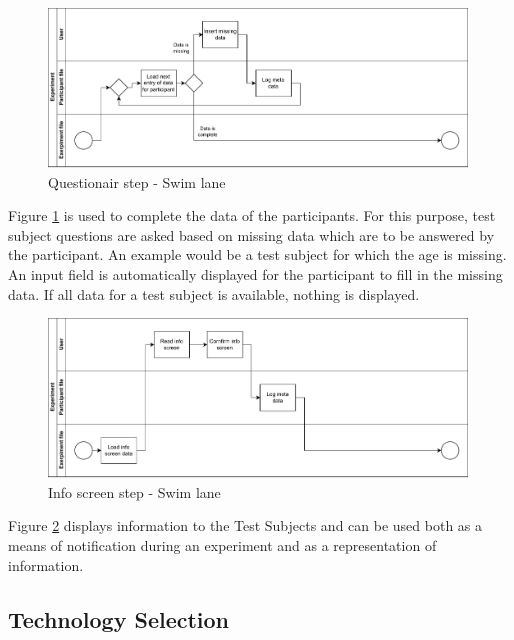 \begin{figure}[htbp]
    \centering
    \includegraphics[width=0.99\textwidth, keepaspectratio]{content/05_design_and_dev_artefacts/QuestionairSwimLane.drawio.pdf}
    \caption{Questionair step - Swim lane}    
    \label{fig:questionairSwimLane}
\end{figure}

Figure \ref{fig:questionairSwimLane} is used to complete the data of the participants. For this purpose, test subject questions are asked based on missing data which are to be answered by the participant. An example would be a test subject for which the age is missing. An input field is automatically displayed for the participant to fill in the missing data. If all data for a test subject is available, nothing is displayed.

\begin{figure}[htbp]
    \centering
    \includegraphics[width=0.99\textwidth, keepaspectratio]{content/05_design_and_dev_artefacts/InfoScreenSwimLane.drawio.pdf}
    \caption{Info screen step - Swim lane}    
    \label{fig:infoScreenSwimLane}
\end{figure}

Figure \ref{fig:infoScreenSwimLane} displays information to the Test Subjects and can be used both as a means of notification during an experiment and as a representation of information.

\subsection{Technology Selection}

